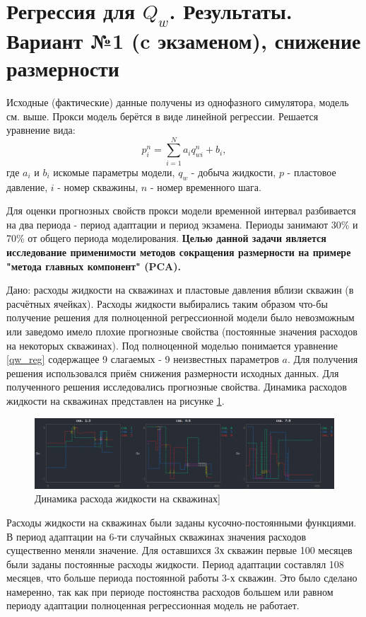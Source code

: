 \documentclass[14pt]{article}
\begin{document}
	\newpage
	
	\section{Регрессия для $Q_w$. Результаты. Вариант №1 (c экзаменом), снижение размерности}

Исходные (фактические) данные получены из однофазного симулятора, модель см. выше. Прокси модель берётся в виде линейной регрессии. Решается уравнение вида:
 \begin{equation}\label{qw_reg}
 		p_i^n = \sum_{i=1}^{N}a_i q_{w i}^n + b_i,
 	\end{equation}
 	где $a_i$ и $b_i$ искомые параметры модели, $q_w$ - добыча жидкости, $p$ - пластовое давление, $i$ - номер скважины, $n$ - номер временного шага.
 	
 	Для оценки прогнозных свойств прокси модели временной интервал разбивается на два периода - период адаптации и период экзамена. Периоды занимают 30\% и 70\% от общего периода моделирования. \textbf{Целью данной задачи является исследование применимости методов сокращения размерности на примере "метода главных компонент" (PCA).} 
 	
 	Дано: расходы жидкости на скважинах и пластовые давления вблизи скважин (в расчётных ячейках). Расходы жидкости выбирались таким образом что-бы получение решения для полноценной регрессионной модели было невозможным или заведомо имело плохие прогнозные свойства (постоянные значения расходов на некоторых скважинах). Под полноценной моделью понимается уравнение \ref{qw_reg} содержащее 9 слагаемых - 9 неизвестных параметров $a$. Для получения решения использовался приём снижения размерности исходных данных. Для полученного решения исследовались прогнозные свойства. Динамика расходов жидкости на скважинах представлен на рисунке \ref{fig:exmpl7qw}.
 	
 	\begin{figure}
 		\centering
 		\includegraphics[width=1.0\linewidth]{exmpl_7_qw}
 		\caption{Динамика расхода жидкости на скважинах]}
 		\label{fig:exmpl7qw}
 	\end{figure}
 	
 	Расходы жидкости на скважинах были заданы кусочно-постоянными функциями. В период адаптации на 6-ти случайных скважинах значения расходов существенно меняли значение. Для оставшихся 3х скважин первые 100 месяцев были заданы постоянные расходы жидкости. Период адаптации составлял 108 месяцев, что больше периода постоянной работы 3-х скважин. Это было сделано намеренно, так как при периоде постоянства расходов большем или равном периоду адаптации полноценная регрессионная модель не работает. 
 	
\end{document}
